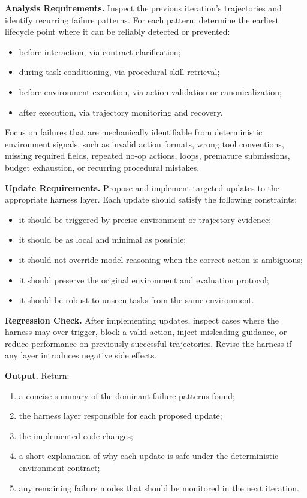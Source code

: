 \begin{tcolorbox}
\vspace{0.5em}
\textbf{Analysis Requirements.}
Inspect the previous iteration's trajectories and identify recurring failure
patterns. For each pattern, determine the earliest lifecycle point where it can
be reliably detected or prevented:
\begin{itemize}
    \item before interaction, via contract clarification;
    \item during task conditioning, via procedural skill retrieval;
    \item before environment execution, via action validation or canonicalization;
    \item after execution, via trajectory monitoring and recovery.
\end{itemize}

Focus on failures that are mechanically identifiable from deterministic
environment signals, such as invalid action formats, wrong tool conventions,
missing required fields, repeated no-op actions, loops, premature submissions,
budget exhaustion, or recurring procedural mistakes.

\vspace{0.5em}
\textbf{Update Requirements.}
Propose and implement targeted updates to the appropriate harness layer. Each
update should satisfy the following constraints:
\begin{itemize}
    \item it should be triggered by precise environment or trajectory evidence;
    \item it should be as local and minimal as possible;
    \item it should not override model reasoning when the correct action is
    ambiguous;
    \item it should preserve the original environment and evaluation protocol;
    \item it should be robust to unseen tasks from the same environment.
\end{itemize}

\vspace{0.5em}
\textbf{Regression Check.}
After implementing updates, inspect cases where the harness may over-trigger,
block a valid action, inject misleading guidance, or reduce performance on
previously successful trajectories. Revise the harness if any layer introduces
negative side effects.

\vspace{0.5em}
\textbf{Output.}
Return:
\begin{enumerate}
    \item a concise summary of the dominant failure patterns found;
    \item the harness layer responsible for each proposed update;
    \item the implemented code changes;
    \item a short explanation of why each update is safe under the deterministic
    environment contract;
    \item any remaining failure modes that should be monitored in the next
    iteration.
\end{enumerate}
\end{tcolorbox}

